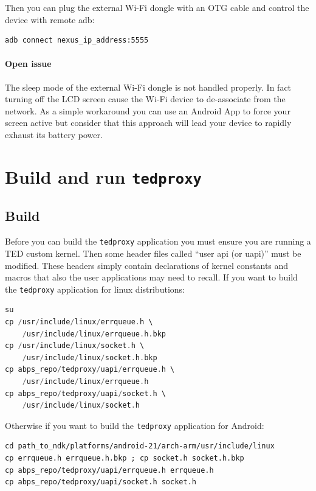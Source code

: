 \documentclass[a4paper]{article}
\begin{document}
Then you can plug the external Wi-Fi dongle with an OTG cable and control the device with remote adb:
	
\begin{lstlisting}
adb connect nexus_ip_address:5555
\end{lstlisting}

\paragraph{Open issue}
The sleep mode of the external Wi-Fi dongle is not handled properly. In fact turning off the LCD screen cause
 the Wi-Fi device to de-associate from the network. As a simple workaround you can use an Android App to force 
your screen active but consider that this approach will lead your device to rapidly exhaust its battery power.

\section{Build and run \texttt{tedproxy}}
\subsection{Build}
Before you can build the \texttt{tedproxy} application you must ensure you are running
a TED custom kernel. Then some header files called ``user api (or uapi)'' must
be modified. These headers simply contain declarations of kernel constants and macros that also the user
applications may need to recall. 
If you want to build the \texttt{tedproxy} application for linux distributions:

\begin{lstlisting}[language=C]
su
cp /usr/include/linux/errqueue.h \
    /usr/include/linux/errqueue.h.bkp
cp /usr/include/linux/socket.h \
    /usr/include/linux/socket.h.bkp
cp abps_repo/tedproxy/uapi/errqueue.h \
    /usr/include/linux/errqueue.h
cp abps_repo/tedproxy/uapi/socket.h \
    /usr/include/linux/socket.h
\end{lstlisting}

Otherwise if you want to build the \texttt{tedproxy} application for Android:

\begin{lstlisting}
cd path_to_ndk/platforms/android-21/arch-arm/usr/include/linux
cp errqueue.h errqueue.h.bkp ; cp socket.h socket.h.bkp
cp abps_repo/tedproxy/uapi/errqueue.h errqueue.h
cp abps_repo/tedproxy/uapi/socket.h socket.h
\end{lstlisting}
\end{document}
